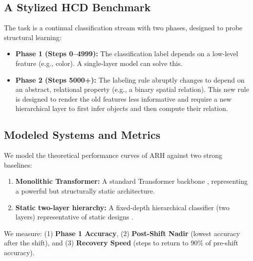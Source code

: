 \documentclass{article}
\numberwithin{figure}{section}
\numberwithin{table}{section}
\numberwithin{algorithm}{section}
\begin{document}
\subsection{A Stylized HCD Benchmark}
The task is a continual classification stream with two phases, designed to probe structural learning:
\begin{itemize}
    \item \textbf{Phase 1 (Steps 0--4999):} The classification label depends on a low-level feature (e.g., color). A single-layer model can solve this.
    \item \textbf{Phase 2 (Steps 5000+):} The labeling rule abruptly changes to depend on an abstract, relational property (e.g., a binary spatial relation). This new rule is designed to render the old features less informative and require a new hierarchical layer to first infer objects and then compute their relation.
\end{itemize}

\subsection{Modeled Systems and Metrics}
We model the theoretical performance curves of ARH against two strong baselines:
\begin{enumerate}
    \item \textbf{Monolithic Transformer:} A standard Transformer backbone \citep{Vaswani2017,Brown2020}, representing a powerful but structurally static architecture.
    \item \textbf{Static two-layer hierarchy:} A fixed-depth hierarchical classifier (two layers) representative of static designs \citep[e.g.,][]{Sabour2017,Andreas2016}.
\end{enumerate}
We measure: (1) \textbf{Phase 1 Accuracy}, (2) \textbf{Post-Shift Nadir} (lowest accuracy after the shift), and (3) \textbf{Recovery Speed} (steps to return to 90\% of pre-shift accuracy).
\end{document}
